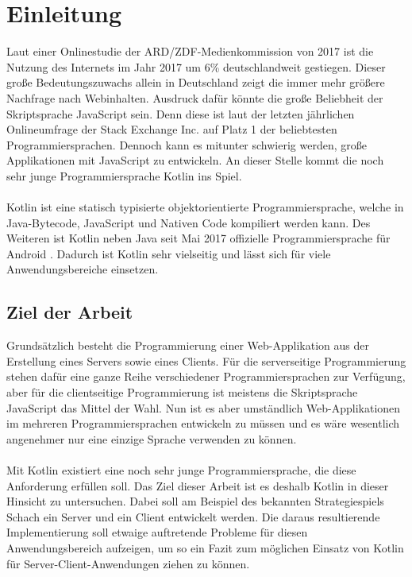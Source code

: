 
\chapter{Einleitung}
Laut einer Onlinestudie der ARD/ZDF-Medienkommission von 2017 \cite{onlineStudy2017,resultsOnlineStudy2017} ist die Nutzung des Internets im Jahr 2017 um 6\% deutschlandweit gestiegen. Dieser große Bedeutungszuwachs allein in Deutschland zeigt die immer mehr größere Nachfrage nach Webinhalten. Ausdruck dafür könnte die große Beliebheit der Skriptsprache JavaScript sein. Denn diese ist laut der letzten jährlichen Onlineumfrage der Stack Exchange Inc. \cite{developerSurvey2017} auf Platz 1 der beliebtesten Programmiersprachen. Dennoch kann es mitunter schwierig werden, große Applikationen mit JavaScript zu entwickeln. An dieser Stelle kommt die noch sehr junge Programmiersprache Kotlin ins Spiel.\\
\\
Kotlin ist eine statisch typisierte objektorientierte Programmiersprache, welche in Java-Bytecode, JavaScript und Nativen Code kompiliert werden kann. Des Weiteren ist Kotlin neben Java seit Mai 2017 offizielle Programmiersprache für Android \cite{kotlinAndroidOfficial}. Dadurch ist Kotlin sehr vielseitig und lässt sich für viele Anwendungsbereiche einsetzen.

\section{Ziel der Arbeit}
Grundsätzlich besteht die Programmierung einer Web-Applikation aus der Erstellung eines Servers sowie eines Clients. Für die serverseitige Programmierung stehen dafür eine ganze Reihe verschiedener Programmiersprachen zur Verfügung, aber für die clientseitige Programmierung ist meistens die Skriptsprache JavaScript das Mittel der Wahl. Nun ist es aber umständlich Web-Applikationen im mehreren Programmiersprachen entwickeln zu müssen und es wäre wesentlich angenehmer nur eine einzige Sprache verwenden zu können.\\
\\
Mit Kotlin existiert eine noch sehr junge Programmiersprache, die diese Anforderung erfüllen soll. Das Ziel dieser Arbeit ist es deshalb Kotlin in dieser Hinsicht zu untersuchen. Dabei soll am Beispiel des bekannten Strategiespiels Schach ein Server und ein Client entwickelt werden. Die daraus resultierende Implementierung soll etwaige auftretende Probleme für diesen Anwendungsbereich aufzeigen, um so ein Fazit zum möglichen Einsatz von Kotlin für Server-Client-Anwendungen ziehen zu können.

